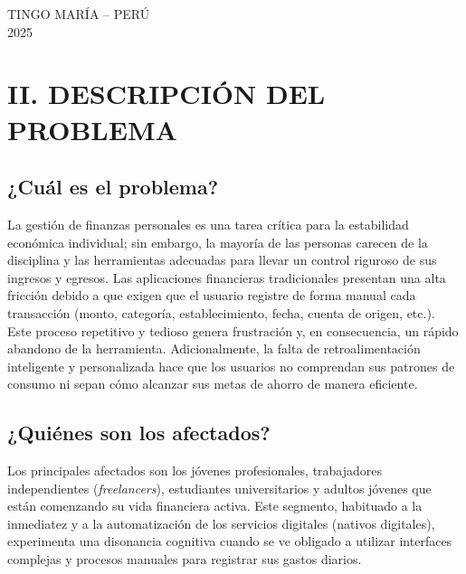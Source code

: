 \documentclass[12pt]{article}
\begin{document}
\begin{titlepage}
    \vfill
    {\fontsize{12pt}{14pt}\selectfont TINGO MARÍA – PERÚ \\ 2025}
    
\end{titlepage}

\newpage

\section{II. DESCRIPCIÓN DEL PROBLEMA}

\subsection{¿Cuál es el problema?}
La gestión de finanzas personales es una tarea crítica para la estabilidad económica individual; sin embargo, la mayoría de las personas carecen de la disciplina y las herramientas adecuadas para llevar un control riguroso de sus ingresos y egresos. Las aplicaciones financieras tradicionales presentan una alta fricción debido a que exigen que el usuario registre de forma manual cada transacción (monto, categoría, establecimiento, fecha, cuenta de origen, etc.). Este proceso repetitivo y tedioso genera frustración y, en consecuencia, un rápido abandono de la herramienta. Adicionalmente, la falta de retroalimentación inteligente y personalizada hace que los usuarios no comprendan sus patrones de consumo ni sepan cómo alcanzar sus metas de ahorro de manera eficiente.

\subsection{¿Quiénes son los afectados?}
Los principales afectados son los jóvenes profesionales, trabajadores independientes (\textit{freelancers}), estudiantes universitarios y adultos jóvenes que están comenzando su vida financiera activa. Este segmento, habituado a la inmediatez y a la automatización de los servicios digitales (nativos digitales), experimenta una disonancia cognitiva cuando se ve obligado a utilizar interfaces complejas y procesos manuales para registrar sus gastos diarios.
\end{document}
